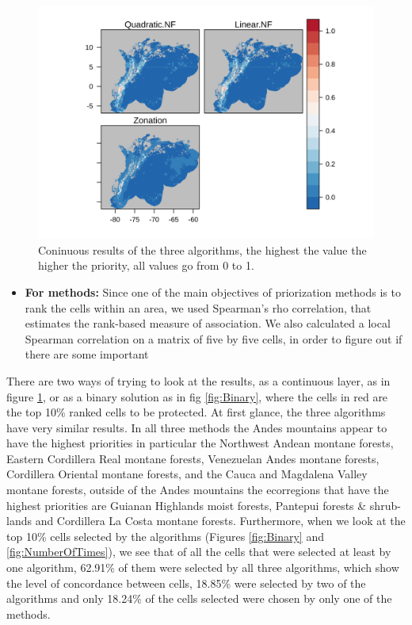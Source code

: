 \documentclass[]{article}
\providecommand{\tightlist}{%
  \setlength{\itemsep}{0pt}\setlength{\parskip}{0pt}}
\begin{document}
\begin{figure}
\centering
\includegraphics{NFPaper_files/figure-latex/AllSols-1.png}
\caption{\label{fig:AllSols}Coninuous results of the three algorithms, the highest the value the higher the priority, all values go from 0 to 1.}
\end{figure}

\begin{itemize}
\tightlist
\item
  \textbf{For methods:} Since one of the main objectives of priorization methods is to rank the cells within an area, we used Spearman's rho correlation, that estimates the rank-based measure of association. We also calculated a local Spearman correlation on a matrix of five by five cells, in order to figure out if there are some important
\end{itemize}

There are two ways of trying to look at the results, as a continuous layer, as in figure \ref{fig:AllSols}, or as a binary solution as in fig \ref{fig:Binary}, where the cells in red are the top 10\% ranked cells to be protected. At first glance, the three algorithms have very similar results. In all three methods the Andes mountains appear to have the highest priorities in particular the Northwest Andean montane forests, Eastern Cordillera Real montane forests, Venezuelan Andes montane forests, Cordillera Oriental montane forests, and the Cauca and Magdalena Valley montane forests, outside of the Andes mountains the ecorregions that have the highest priorities are Guianan Highlands moist forests, Pantepui forests \& shrub-lands and Cordillera La Costa montane forests. Furthermore, when we look at the top 10\% cells selected by the algorithms (Figures \ref{fig:Binary} and \ref{fig:NumberOfTimes}), we see that of all the cells that were selected at least by one algorithm, 62.91\% of them were selected by all three algorithms, which show the level of concordance between cells, 18.85\% were selected by two of the algorithms and only 18.24\% of the cells selected were chosen by only one of the methods.
\end{document}
